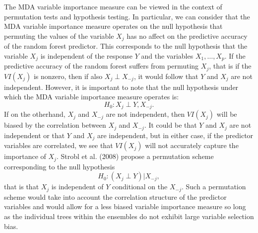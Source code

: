 \documentclass[12pt,twoside]{reedthesis}
\theoremstyle{definition}
\theoremstyle{definition}
\theoremstyle{definition}
\theoremstyle{remark}
\begin{document}
The MDA variable importance measure can be viewed in the context of
permutation tests and hypothesis testing. In particular, we can consider
that the MDA variable importance measure operates on the null hypothesis
that permuting the values of the variable \(X_j\) has no affect on the
predictive accuracy of the random forest predictor. This corresponds to
the null hypothesis that the variable \(X_j\) is independent of the
response \(Y\) and the variables \(X_1,\ldots,X_p\). If the predictive
accuracy of the random forest suffers from permuting \(X_j\), that is if
the \(VI(X_j)\) is nonzero, then if also \(X_j\perp X_{-j}\), it would
follow that \(Y\) and \(X_j\) are not independent. However, it is
important to note that the null hypothesis under which the MDA variable
importance measure operates is: \[H_0:X_j \perp Y,X_{-j}.\] If on the
otherhand, \(X_j\) and \(X_{-j}\) are not independent, then \(VI(X_j)\)
will be biased by the correlation between \(X_j\) and \(X_{-j}\). It
could be that \(Y\) and \(X_j\) are not independent or that \(Y\) and
\(X_j\) are independent, but in either case, if the predictor variables
are correlated, we see that \(VI(X_j)\) will not accurately capture the
importance of \(X_j\). Strobl et al. (2008) propose a permutation scheme
corresponding to the null hypothesis \[H_0:(X_j\perp Y)|X_{-j},\] that
is that \(X_j\) is independent of \(Y\) conditional on the \(X_{-j}\).
Such a permutation scheme would take into account the correlation
structure of the predictor variables and would allow for a less biased
variable importance measure so long as the individual trees within the
ensembles do not exhibit large variable selection bias.
\end{document}
